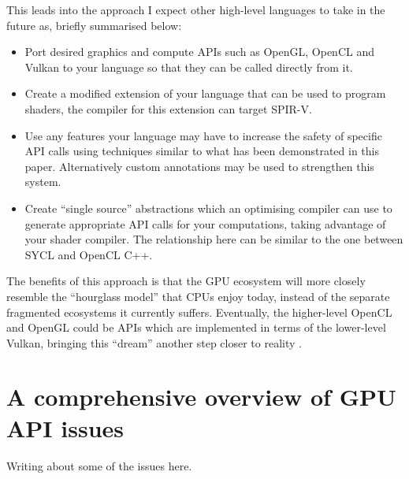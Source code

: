 \documentclass[a4paper,12pt,twoside,openright]{report}
\begin{document}
This leads into the approach I expect other high-level languages to take in the
future as, briefly summarised below:

\begin{itemize}

    \item Port desired graphics and compute APIs such as OpenGL, OpenCL and
    Vulkan to your language so that they can be called directly from it.

    \item Create a modified extension of your language that can be used to
    program shaders, the compiler for this extension can target SPIR-V.

    \item Use any features your language may have to increase the safety of
    specific API calls using techniques similar to what has been demonstrated
    in this paper. Alternatively custom annotations may be used to strengthen
    this system.

    \item Create ``single source'' abstractions which an optimising compiler
    can use to generate appropriate API calls for your computations, taking
    advantage of your shader compiler. The relationship here can be similar to
    the one between SYCL and OpenCL C++.

\end{itemize}

The benefits of this approach is that the GPU ecosystem will more closely
resemble the ``hourglass model'' that CPUs enjoy today, instead of the separate
fragmented ecosystems it currently suffers. Eventually, the higher-level OpenCL
and OpenGL could be APIs which are implemented in terms of the lower-level
Vulkan, bringing this ``dream'' another step closer to reality
\cite{OpenGLonVulkan} \cite{VulkanOpenCLMerge} \cite{OpenGLOverload}.






\appendix
\singlespacing

\chapter{A comprehensive overview of GPU API issues}

\label{app:other_API_issues}

Writing about some of the issues here.
\end{document}
